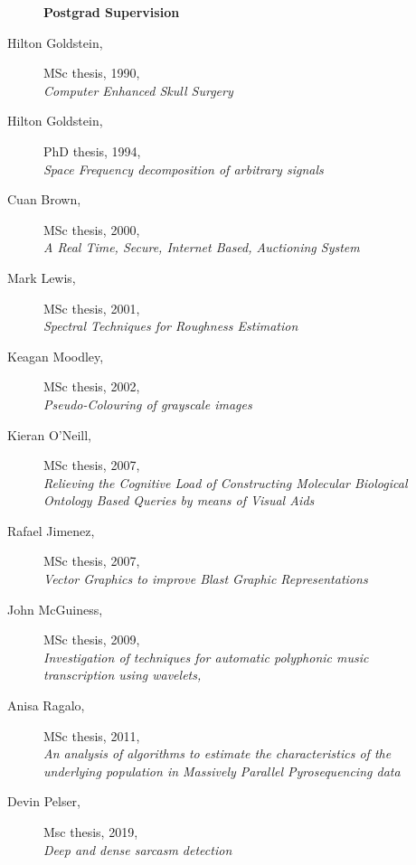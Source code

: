 \documentclass[12pt]{article}
\begin{document}
\newpage
\begin{multicols}{2}
\begin{description}\item[] \begin{description}\item[] {\large \bf   Postgrad Supervision}
\item[Hilton Goldstein,] MSc thesis, 1990, \\
      {\em Computer Enhanced Skull Surgery}
\item[Hilton Goldstein,] PhD thesis, 1994, \\
      {\em Space Frequency decomposition of arbitrary signals}
\item[Cuan Brown,] MSc thesis,  2000,\\
      {\em A Real Time, Secure, Internet Based, Auctioning System}
 \item[Mark Lewis,] MSc thesis, 2001, \\
      {\em Spectral Techniques for Roughness Estimation}
\item[Keagan Moodley,] MSc thesis, 2002, \\
      {\em Pseudo-Colouring of grayscale images}
\item[Kieran O'Neill,] MSc thesis,  2007, \\
       {\it Relieving the Cognitive Load of Constructing Molecular
       Biological Ontology Based Queries by means of Visual Aids}
\item[Rafael Jimenez,] MSc thesis, 2007, \\
       {\em Vector Graphics to improve Blast Graphic
       Representations}
\item[John McGuiness,] MSc thesis, 2009, \\
       {\em Investigation of techniques for automatic polyphonic
       music transcription using wavelets,}
\item[Anisa Ragalo,] MSc thesis, 2011, \\
        {\em An analysis of algorithms to estimate the characteristics 
        of the underlying population in Massively Parallel Pyrosequencing data}
\item[Devin Pelser,] Msc thesis, 2019, \\
        {\em Deep and dense sarcasm detection}
\end{description}
\end{description}


\end{multicols}
\end{document}
